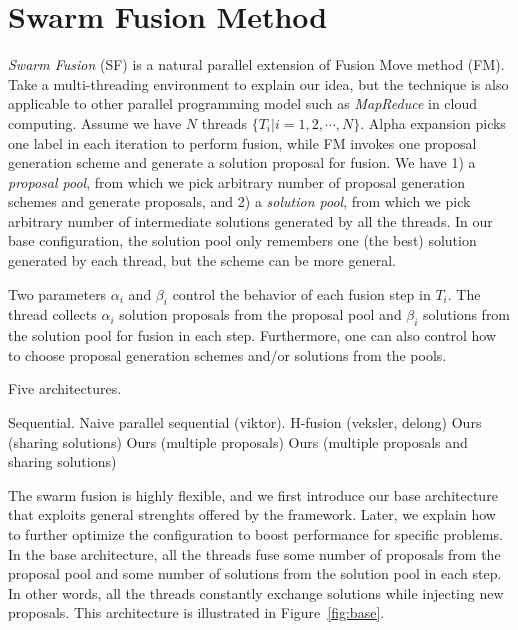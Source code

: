 \section{Swarm Fusion Method}
  {\it Swarm Fusion} (SF) is a
natural parallel extension of Fusion Move method (FM). Take a
multi-threading environment to explain our idea, but the technique is also
applicable to other parallel programming model such as {\it MapReduce}
in cloud computing.
%
Assume we have $N$ threads $\{T_i | i=1, 2, \cdots, N\}$.  Alpha
expansion picks one label in each iteration to perform fusion, while FM
invokes one proposal generation scheme and generate a solution proposal
for fusion. We have 1) a {\it proposal pool}, from which we pick
arbitrary number of proposal generation schemes and generate proposals,
and 2) a {\it solution pool}, from which we pick arbitrary number of
intermediate solutions generated by all the threads.
%
%
In our base configuration, the solution pool only remembers one (the
best) solution generated by each thread, but the scheme can be more
general.



Two parameters $\alpha_i$ and $\beta_i$
control the behavior of each fusion step in $T_i$. The thread collects
$\alpha_i$ solution proposals from the proposal pool and $\beta_i$
solutions from the solution pool for fusion in each step.
%
Furthermore, one can also control how to choose proposal generation
schemes and/or solutions from the pools.



Five architectures.

Sequential.
Naive parallel sequential (viktor).
H-fusion (veksler, delong)
Ours (sharing solutions)
Ours (multiple proposals)
Ours (multiple proposals and sharing solutions)





The swarm fusion is highly flexible, and we first introduce our base
architecture that exploits general strenghts offered by the
framework. Later, we explain how to further optimize the configuration
to boost performance for specific problems. In the base architecture,
all the threads fuse some number of proposals from the proposal pool and
some number of solutions from the solution pool in each step. In other
words, all the threads constantly exchange solutions while injecting new
proposals. This architecture is illustrated in Figure~\ref{fig:base}.

